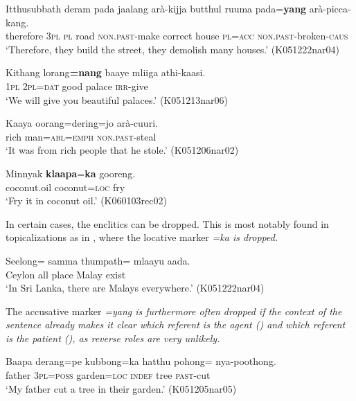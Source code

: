 \documentclass[a4paper,10pt]{article}
\begin{document}
\ea\label{ex:intro:yang}
\gll Itthusubbath   deram pada    jaalang arà-kijja  butthul ruuma pada=\textbf{yang}   arà-picca-kang. \\ %
     therefore \textsc{3pl} \textsc{pl} road \textsc{non.past}-make correct house \textsc{pl}=\textsc{acc} \textsc{non.past}-broken-\textsc{caus}  \\
    `Therefore, they build the street, they demolish  many houses.'  (K051222nar04)
\z  

\ea\label{ex:intro:nang}
\gll Kithang lorang\textbf{=nang}   baaye mliiga athi-kaasi. \\
     \textsc{1pl} \textsc{2pl}=\textsc{dat} good palace \textsc{irr}-give  \\
    `We will give you beautiful palaces.' (K051213nar06)
\z

\ea\label{ex:intro:dering}
\gll Kaaya oorang=dering=jo arà-cuuri. \\
     rich man=\textsc{abl}=\textsc{emph} \textsc{non.past}-steal \\
    `It was from rich people that he stole.'  (K051206nar02)
\z 

\ea\label{ex:intro:ka}
\gll Minnyak \textbf{klaapa}=\textbf{ka} gooreng. \\
     coconut.oil coconut=\textsc{loc} fry  \\
    `Fry it in coconut oil.' (K060103rec02)
\z 

In certain cases, the enclitics can be dropped. This is most notably found in topicalizations as in , where the locative marker \em =ka \em is dropped.

\ea\label{ex:intro:topicalization} 
\gll Seelong=\zero{} samma thumpath=\zero{} mlaayu aada. \\
 Ceylon all place Malay exist\\
    `In Sri Lanka, there are Malays everywhere.' (K051222nar04)
\z 

The accusative marker \em =yang \em is furthermore often dropped if the context of the sentence already makes it clear which referent is the agent () and which referent is the patient (), as reverse roles are very unlikely.

\ea\label{ex:intro:yangdrop}
\gll Baapa  derang=pe     kubbong=ka   hatthu pohong=\zero{} nya-poothong. \\
      father \textsc{3pl}=\textsc{poss} garden=\textsc{loc} \textsc{indef} tree \textsc{past}-cut \\
    `My father cut a tree in their garden.' (K051205nar05)
\z
\end{document}
